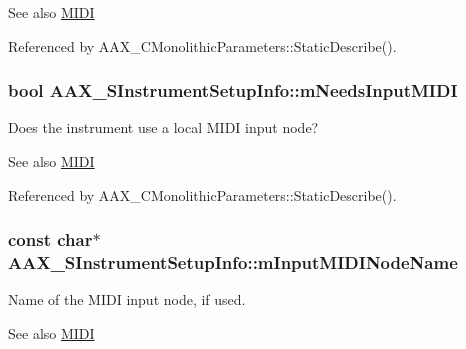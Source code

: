 \begin{DoxySeeAlso}{See also}
\hyperlink{a00336}{M\+I\+D\+I} 
\end{DoxySeeAlso}


Referenced by A\+A\+X\+\_\+\+C\+Monolithic\+Parameters\+::\+Static\+Describe().

\hypertarget{a00124_a69f737db7dfa0c8362a0b368dc3e19e9}{}
\subsubsection[{m\+Needs\+Input\+M\+I\+D\+I}]{\setlength{\rightskip}{0pt plus 5cm}bool A\+A\+X\+\_\+\+S\+Instrument\+Setup\+Info\+::m\+Needs\+Input\+M\+I\+D\+I}\label{a00124_a69f737db7dfa0c8362a0b368dc3e19e9}


Does the instrument use a local M\+I\+D\+I input node? 

\begin{DoxySeeAlso}{See also}
\hyperlink{a00336}{M\+I\+D\+I} 
\end{DoxySeeAlso}


Referenced by A\+A\+X\+\_\+\+C\+Monolithic\+Parameters\+::\+Static\+Describe().

\hypertarget{a00124_ac9206c672bf45367ae0987b6adafb736}{}
\subsubsection[{m\+Input\+M\+I\+D\+I\+Node\+Name}]{\setlength{\rightskip}{0pt plus 5cm}const char$\ast$ A\+A\+X\+\_\+\+S\+Instrument\+Setup\+Info\+::m\+Input\+M\+I\+D\+I\+Node\+Name}\label{a00124_ac9206c672bf45367ae0987b6adafb736}


Name of the M\+I\+D\+I input node, if used. 

\begin{DoxySeeAlso}{See also}
\hyperlink{a00336}{M\+I\+D\+I} 
\end{DoxySeeAlso}


